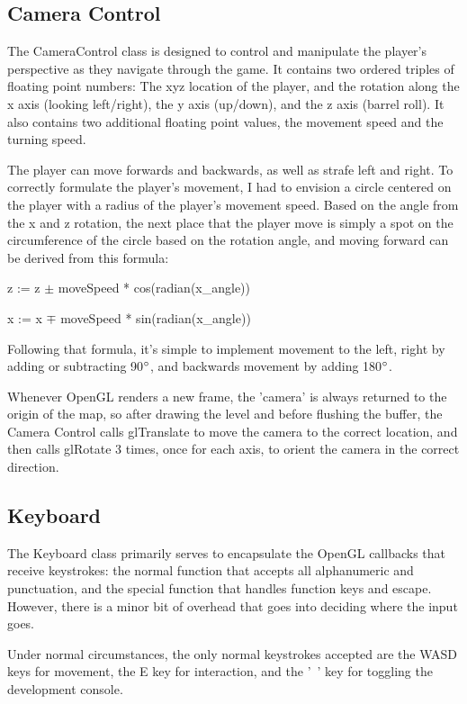 \documentclass{article}
\begin{document}
\subsection{Camera Control}
The CameraControl class is designed to control and manipulate the player's perspective as they navigate through the game. It contains two ordered triples of floating point numbers: The xyz location of the player, and the rotation along the x axis (looking left/right), the y axis (up/down), and the z axis (barrel roll). It also contains two additional floating point values, the movement speed and the turning speed. 

The player can move forwards and backwards, as well as strafe left and right. To correctly formulate the player's movement, I had to envision a circle centered on the player with a radius of the player's movement speed. Based on the angle from the x and z rotation, the next place that the player move is simply a spot on the circumference of the circle based on the rotation angle, and moving forward can be derived from this formula:

z := z $\pm$ moveSpeed * cos(radian(x\_angle))

x := x $\mp$ moveSpeed * sin(radian(x\_angle))

\cite{Deyoso}

Following that formula, it's simple to implement movement to the left, right by adding or subtracting 90$\degree$, and backwards movement by adding 180$\degree$.

Whenever OpenGL renders a new frame, the 'camera' is always returned to the origin of the map, so after drawing the level and before flushing the buffer, the Camera Control calls glTranslate to move the camera to the correct location, and then calls glRotate 3 times, once for each axis, to orient the camera in the correct direction.

\subsection{Keyboard}
The Keyboard class primarily serves to encapsulate the OpenGL callbacks that receive keystrokes: the normal function that accepts all alphanumeric and punctuation, and the special function that handles function keys and escape. However, there is a minor bit of overhead that goes into deciding where the input goes.

Under normal circumstances, the only normal keystrokes accepted are the WASD keys for movement, the E key for interaction, and the '~' key for toggling the development console.
\end{document}
